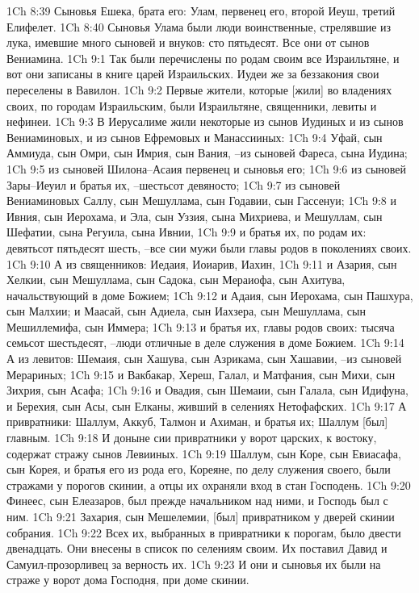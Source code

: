 1Ch 8:39  Сыновья Ешека, брата его: Улам, первенец его, второй Иеуш, третий Елифелет.
1Ch 8:40  Сыновья Улама были люди воинственные, стрелявшие из лука, имевшие много сыновей и внуков: сто пятьдесят. Все они от сынов Вениамина.
1Ch 9:1  Так были перечислены по родам своим все Израильтяне, и вот они записаны в книге царей Израильских. Иудеи же за беззакония свои переселены в Вавилон.
1Ch 9:2  Первые жители, которые [жили] во владениях своих, по городам Израильским, были Израильтяне, священники, левиты и нефинеи.
1Ch 9:3  В Иерусалиме жили некоторые из сынов Иудиных и из сынов Вениаминовых, и из сынов Ефремовых и Манассииных:
1Ch 9:4  Уфай, сын Аммиуда, сын Омри, сын Имрия, сын Вания, --из сыновей Фареса, сына Иудина;
1Ch 9:5  из сыновей Шилона--Асаия первенец и сыновья его;
1Ch 9:6  из сыновей Зары--Иеуил и братья их, --шестьсот девяносто;
1Ch 9:7  из сыновей Вениаминовых Саллу, сын Мешуллама, сын Годавии, сын Гассенуи;
1Ch 9:8  и Ивния, сын Иерохама, и Эла, сын Уззия, сына Михриева, и Мешуллам, сын Шефатии, сына Регуила, сына Ивнии,
1Ch 9:9  и братья их, по родам их: девятьсот пятьдесят шесть, --все сии мужи были главы родов в поколениях своих.
1Ch 9:10  А из священников: Иедаия, Иоиарив, Иахин,
1Ch 9:11  и Азария, сын Хелкии, сын Мешуллама, сын Садока, сын Мераиофа, сын Ахитува, начальствующий в доме Божием;
1Ch 9:12  и Адаия, сын Иерохама, сын Пашхура, сын Малхии; и Маасай, сын Адиела, сын Иахзера, сын Мешуллама, сын Мешиллемифа, сын Иммера;
1Ch 9:13  и братья их, главы родов своих: тысяча семьсот шестьдесят, --люди отличные в деле служения в доме Божием.
1Ch 9:14  А из левитов: Шемаия, сын Хашува, сын Азрикама, сын Хашавии, --из сыновей Мерариных;
1Ch 9:15  и Вакбакар, Хереш, Галал, и Матфания, сын Михи, сын Зихрия, сын Асафа;
1Ch 9:16  и Овадия, сын Шемаии, сын Галала, сын Идифуна, и Берехия, сын Асы, сын Елканы, живший в селениях Нетофафских.
1Ch 9:17  А привратники: Шаллум, Аккуб, Талмон и Ахиман, и братья их; Шаллум [был] главным.
1Ch 9:18  И доныне сии привратники у ворот царских, к востоку, содержат стражу сынов Левииных.
1Ch 9:19  Шаллум, сын Коре, сын Евиасафа, сын Корея, и братья его из рода его, Кореяне, по делу служения своего, были стражами у порогов скинии, а отцы их охраняли вход в стан Господень.
1Ch 9:20  Финеес, сын Елеазаров, был прежде начальником над ними, и Господь был с ним.
1Ch 9:21  Захария, сын Мешелемии, [был] привратником у дверей скинии собрания.
1Ch 9:22  Всех их, выбранных в привратники к порогам, было двести двенадцать. Они внесены в список по селениям своим. Их поставил Давид и Самуил-прозорливец за верность их.
1Ch 9:23  И они и сыновья их были на страже у ворот дома Господня, при доме скинии.
